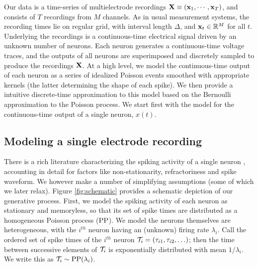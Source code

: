Our data is a time-series of multielectrode recordings $\mathbf{X} \equiv (\mathbf{x}_1, \cdots, \mathbf{x}_T)$, and consists of $T$ recordings from $M$ channels. 
As in usual measurement systems, the recording times lie on regular grid, with interval length $\Delta$, and $\mathbf{x}_t \in \mathbb{R}^M$ for all $t$. 
Underlying the recordings is a continuous-time electrical signal driven by an unknown number of neurons. %
Each neuron generates a continuous-time voltage traces, and  the outputs of all neurons are superimposed and discretely sampled to produce 
the recordings $\mathbf{X}$.  At a high level, we model the continuous-time output of each neuron as a
series of idealized Poisson events smoothed with appropriate kernels (the latter determining the shape of each spike).
We then provide a intuitive discrete-time approximation to this model based on the Bernoulli approximation to the Poisson process.
% 
We start first with the model for the continuous-time output of a single neuron, $x(t)$.

\subsection{Modeling a single electrode recording}
There is a rich literature characterizing the spiking activity of a single neuron \citep{?}, accounting in detail for factors like non-stationarity, 
refractoriness and spike waveform. We however make a number of simplifying assumptions (some of which we later relax).
Figure \ref{fig:schematic}  provides a schematic depiction of our generative process.
First, we model the spiking activity of each neuron as stationary and memoryless, so that its set of spike times are 
distributed as a homogeneous Poisson process ($\text{PP}$).  %
 We model the neurons themselves are heterogeneous, with the $i^{th}$ neuron having
an (unknown) firing rate $\lambda_i$. 
Call the ordered set of spike times of the $i^{th}$ neuron $\mathcal{T}_i=(\tau_{i1}, \tau_{i2},\ldots)$; then the time between successive elements of $\mathcal{T}_i$ is 
exponentially distributed with mean $1/\lambda_i$. We write this as
$ \mathcal{T}_i \sim \text{PP}(\lambda_i)$.


